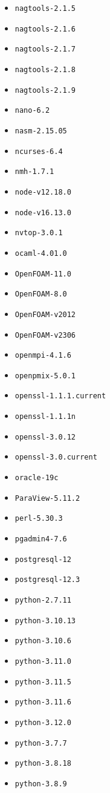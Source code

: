 \begin{multicols}{3}
\begin{itemize}
\item \verb|nagtools-2.1.5|
\item \verb|nagtools-2.1.6|
\item \verb|nagtools-2.1.7|
\item \verb|nagtools-2.1.8|
\item \verb|nagtools-2.1.9|
\item \verb|nano-6.2|
\item \verb|nasm-2.15.05|
\item \verb|ncurses-6.4|
\item \verb|nmh-1.7.1|
\item \verb|node-v12.18.0|
\item \verb|node-v16.13.0|
\item \verb|nvtop-3.0.1|
\item \verb|ocaml-4.01.0|
\item \verb|OpenFOAM-11.0|
\item \verb|OpenFOAM-8.0|
\item \verb|OpenFOAM-v2012|
\item \verb|OpenFOAM-v2306|
\item \verb|openmpi-4.1.6|
\item \verb|openpmix-5.0.1|
\item \verb|openssl-1.1.1.current|
\item \verb|openssl-1.1.1n|
\item \verb|openssl-3.0.12|
\item \verb|openssl-3.0.current|
\item \verb|oracle-19c|
\item \verb|ParaView-5.11.2|
\item \verb|perl-5.30.3|
\item \verb|pgadmin4-7.6|
\item \verb|postgresql-12|
\item \verb|postgresql-12.3|
\item \verb|python-2.7.11|
\item \verb|python-3.10.13|
\item \verb|python-3.10.6|
\item \verb|python-3.11.0|
\item \verb|python-3.11.5|
\item \verb|python-3.11.6|
\item \verb|python-3.12.0|
\item \verb|python-3.7.7|
\item \verb|python-3.8.18|
\item \verb|python-3.8.9|

\end{itemize}
\end{multicols}
